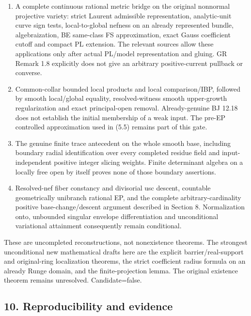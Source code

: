 \documentclass[
  10pt,
]{article}
\providecommand{\tightlist}{%
  \setlength{\itemsep}{0pt}\setlength{\parskip}{0pt}}
\begin{document}
\begin{enumerate}
\def\labelenumi{\arabic{enumi}.}
\tightlist
\item
  A complete continuous rational metric bridge on the original nonnormal
  projective variety: strict Laurent admissible representation,
  analytic-unit curve sign tests, local-to-global nefness on an already
  represented bundle, algebraization, BE same-class FS approximation,
  exact Gauss coefficient cutoff and compact PL extension. The relevant
  sources allow these applications only after actual PL/model
  representation and gluing. GR Remark 1.8 explicitly does not give an
  arbitrary positive-current pullback or converse.
\item
  Common-collar bounded local products and local comparison/IBP,
  followed by smooth local/global equality, resolved-witness smooth
  upper-growth regularization and exact principal-open removal.
  Already-genuine BJ 12.18 does not establish the initial membership of
  a weak input. The pre-EP controlled approximation used in (5.5)
  remains part of this gate.
\item
  The genuine finite trace antecedent on the whole smooth base,
  including boundary radial identification over every completed residue
  field and input-independent positive integer slicing weights. Finite
  determinant algebra on a locally free open by itself proves none of
  those boundary assertions.
\item
  Resolved-nef fiber constancy and divisorial usc descent, countable
  geometrically unibranch rational EP, and the complete
  arbitrary-cardinality positive base-change/descent argument described
  in Section 8. Normalization onto, unbounded singular envelope
  differentiation and unconditional variational attainment consequently
  remain conditional.
\end{enumerate}

These are uncompleted reconstructions, not nonexistence theorems. The
strongest unconditional new mathematical drafts here are the explicit
barrier/real-support and original-ring localization theorems, the strict
coefficient radius formula on an already Runge domain, and the
finite-projection lemma. The original existence theorem remains
unresolved. Candidate=false.

\subsection{10. Reproducibility and
evidence}\label{reproducibility-and-evidence}
\end{document}
